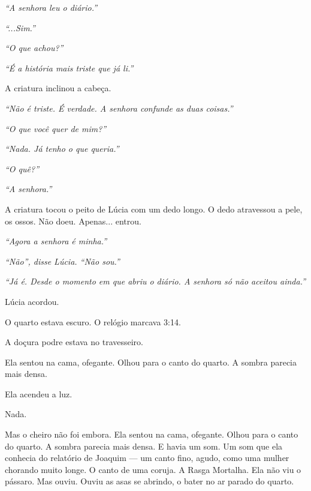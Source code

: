 \noindent \textit{\textquotedblleft{}A senhora leu o diário.\textquotedblright{}}

\noindent \textit{\textquotedblleft{}...Sim.\textquotedblright{}}

\noindent \textit{\textquotedblleft{}O que achou?\textquotedblright{}}

\noindent \textit{\textquotedblleft{}É a história mais triste que já li.\textquotedblright{}}

\noindent A criatura inclinou a cabeça.

\noindent \textit{\textquotedblleft{}Não é triste. É verdade. A senhora confunde as duas coisas.\textquotedblright{}}

\noindent \textit{\textquotedblleft{}O que você quer de mim?\textquotedblright{}}

\noindent \textit{\textquotedblleft{}Nada. Já tenho o que queria.\textquotedblright{}}

\noindent \textit{\textquotedblleft{}O quê?\textquotedblright{}}

\noindent \textit{\textquotedblleft{}A senhora.\textquotedblright{}}

\noindent A criatura tocou o peito de Lúcia com um dedo longo. O dedo atravessou a pele, os ossos. Não doeu. Apenas... entrou.

\noindent \textit{\textquotedblleft{}Agora a senhora é minha.\textquotedblright{}}

\noindent \textit{\textquotedblleft{}Não\textquotedblright{}\textit{, disse Lúcia. }\textquotedblleft{}Não sou.\textquotedblright{}}

\noindent \textit{\textquotedblleft{}Já é. Desde o momento em que abriu o diário. A senhora só não aceitou ainda.\textquotedblright{}}

\noindent Lúcia acordou.

\noindent O quarto estava escuro. O relógio marcava 3:14.

\noindent A doçura podre estava no travesseiro.

\noindent Ela sentou na cama, ofegante. Olhou para o canto do quarto. A sombra parecia mais densa.

\noindent Ela acendeu a luz.

\noindent Nada.

\noindent Mas o cheiro não foi embora.
\noindent Ela sentou na cama, ofegante. Olhou para o canto do quarto. A sombra parecia mais densa. E havia um som. Um som que ela conhecia do relatório de Joaquim — um canto fino, agudo, como uma mulher chorando muito longe. O canto de uma coruja. A Rasga Mortalha. Ela não viu o pássaro. Mas ouviu. Ouviu as asas se abrindo, o bater no ar parado do quarto.


